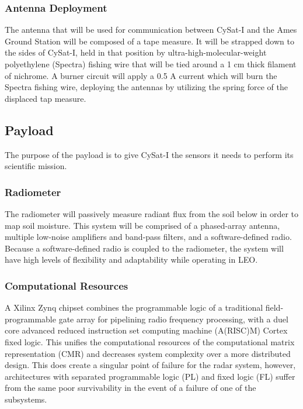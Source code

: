 \documentclass[12pt]{article}
\begin{document}
\subsubsection{Antenna Deployment}

The antenna that will be used for communication between CySat-I and the Ames Ground Station will be composed of a tape measure. It will be strapped down to the sides of CySat-I, held in that position by ultra-high-molecular-weight polyethylene (Spectra) fishing wire that will be tied around a 1 \si{\centi\meter} thick filament of nichrome. A burner circuit will apply a 0.5 \si{\ampere} current which will burn the Spectra fishing wire, deploying the antennas by utilizing the spring force of the displaced tap measure.

\subsection{Payload}

The purpose of the payload is to give CySat-I the sensors it needs to perform its scientific mission.

\subsubsection{Radiometer}

The radiometer will passively measure radiant flux from the soil below in order to map soil moisture. This system will be comprised of a phased-array antenna, multiple low-noise amplifiers and band-pass filters, and a software-defined radio. Because a software-defined radio is coupled to the radiometer, the system will have high levels of flexibility and adaptability while operating in LEO.

\subsubsection{Computational Resources}

A Xilinx Zynq chipset combines the programmable logic of a traditional field-programmable gate array for pipelining radio frequency processing, with a duel core advanced reduced instruction set computing machine (A(RISC)M) Cortex fixed logic. This unifies the computational resources of the computational matrix representation (CMR) and decreases system complexity over a more distributed design. This does create a singular point of failure for the radar system, however, architectures with separated programmable logic (PL) and fixed logic (FL) suffer from the same poor survivability in the event of a failure of one of the subsystems.
\end{document}
